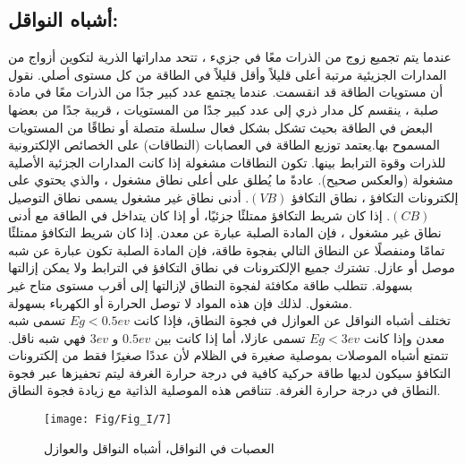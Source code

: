 \subsection{أشباه النواقل:}
عندما يتم تجميع زوج من الذرات معًا في جزيء ، تتحد مداراتها الذرية لتكوين أزواج من المدارات الجزيئية مرتبة أعلى قليلاً وأقل قليلاً في الطاقة من كل مستوى أصلي. نقول أن مستويات الطاقة قد انقسمت. عندما يجتمع عدد كبير جدًا من الذرات معًا في مادة صلبة ، ينقسم كل مدار ذري إلى عدد كبير جدًا من المستويات ، قريبة جدًا من بعضها البعض في الطاقة بحيث تشكل بشكل فعال سلسلة متصلة أو نطاقًا من المستويات المسموح بها.يعتمد توزيع الطاقة في العصابات (النطاقات) على الخصائص الإلكترونية للذرات وقوة الترابط بينها. تكون النطاقات مشغولة إذا كانت المدارات الجزئية الأصلية مشغولة (والعكس صحيح). عادةً ما يُطلق على أعلى نطاق مشغول ، والذي يحتوي على إلكترونات التكافؤ ، نطاق التكافؤ $ (VB) $. أدنى نطاق غير مشغول يسمى نطاق التوصيل $ (CB) $. إذا كان شريط التكافؤ ممتلئًا جزئيًا، أو إذا كان يتداخل في الطاقة مع أدنى نطاق غير مشغول ، فإن المادة الصلبة عبارة عن معدن. إذا كان شريط التكافؤ ممتلئًا تمامًا ومنفصلًا عن النطاق التالي بفجوة طاقة، فإن المادة الصلبة تكون عبارة عن شبه موصل أو عازل. تشترك جميع الإلكترونات في نطاق التكافؤ في الترابط ولا يمكن إزالتها بسهولة. تتطلب طاقة مكافئة لفجوة النطاق لإزالتها إلى أقرب مستوى متاح غير مشغول. لذلك فإن هذه المواد لا توصل الحرارة أو الكهرباء بسهولة.
\\تختلف أشباه النواقل عن العوازل في فجوة النطاق، فإذا كانت $ Eg<0.5ev  $ تسمى شبه معدن وإذا كانت $ Eg<3ev  $ تسمى عازلا، أما إذا كانت بين $ 0.5ev $ و $ 3ev $ فهي شبه ناقل. تتمتع أشباه الموصلات بموصلية صغيرة في الظلام لأن عددًا صغيرًا فقط من إلكترونات التكافؤ سيكون لديها طاقة حركية كافية في درجة حرارة الغرفة ليتم تحفيزها عبر فجوة النطاق في درجة حرارة الغرفة. تتناقص هذه الموصلية الذاتية مع زيادة فجوة النطاق.
\begin{figure}[h!]
	\centering
	\texttt{[image: Fig/Fig\_I/7]}
	\caption{العصبات في النواقل، أشباه النواقل والعوازل}
	\label{fig:7}
\end{figure}
\FloatBarrier
